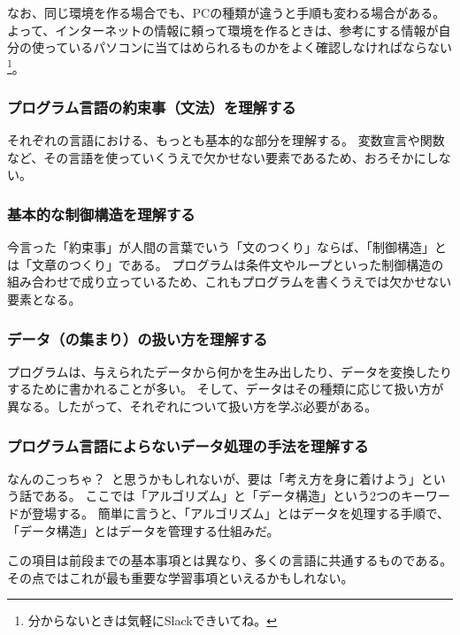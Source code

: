 \documentclass[lualatex,ja=standard,12pt,a4j]{bxjsbook}
\begin{document}
					なお、同じ環境を作る場合でも、PCの種類が違うと手順も変わる場合がある。
	                よって、インターネットの情報に頼って環境を作るときは、参考にする情報が自分の使っているパソコンに当てはめられるものかをよく確認しなければならない\footnote{分からないときは気軽にSlackできいてね。}。
					
				\subsubsection{プログラム言語の約束事（文法）を理解する}
	                それぞれの言語における、もっとも基本的な部分を理解する。
                  変数宣言や関数など、その言語を使っていくうえで欠かせない要素であるため、おろそかにしない。
				
				\subsubsection{基本的な制御構造を理解する}
					今言った「約束事」が人間の言葉でいう「文のつくり」ならば、「制御構造」とは「文章のつくり」である。
	                プログラムは条件文やループといった制御構造の組み合わせで成り立っているため、これもプログラムを書くうえでは欠かせない要素となる。
	                
				\subsubsection{データ（の集まり）の扱い方を理解する}
					プログラムは、与えられたデータから何かを生み出したり、データを変換したりするために書かれることが多い。
	                そして、データはその種類に応じて扱い方が異なる。したがって、それぞれについて扱い方を学ぶ必要がある。
					
				\subsubsection{プログラム言語によらないデータ処理の手法を理解する}
					なんのこっちゃ？\ と思うかもしれないが、要は「考え方を身に着けよう」という話である。
	                ここでは「アルゴリズム」と「データ構造」という2つのキーワードが登場する。
	                簡単に言うと、「アルゴリズム」とはデータを処理する手順で、「データ構造」とはデータを管理する仕組みだ。
	                
	                この項目は前段までの基本事項とは異なり、多くの言語に共通するものである。
	                その点ではこれが最も重要な学習事項といえるかもしれない。
					
\end{document}
